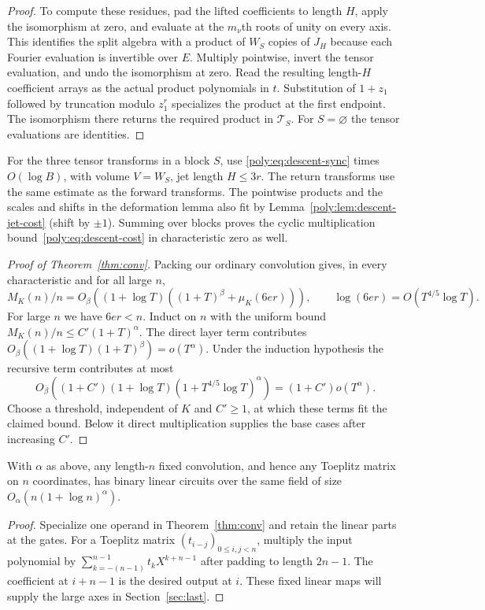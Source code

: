 \begin{proof}
To compute these residues, pad the lifted coefficients to length $H$,
apply the isomorphism at zero, and evaluate at the $m_\nu$th roots of
unity on every axis. This identifies the split algebra with a product
of $W_S$ copies of $J_H$ because each Fourier evaluation is invertible
over $E$. Multiply pointwise, invert the tensor evaluation, and undo
the isomorphism at zero. Read the resulting length-$H$ coefficient
arrays as the actual product polynomials in $t$. Substitution of $1+z_1$
followed by truncation modulo $z_1^r$ specializes the product at the first
endpoint. The isomorphism there returns the required product in
$\mathcal T_S$. For $S=\varnothing$ the tensor evaluations are identities.
\end{proof}

For the three tensor transforms in a block $S$,
use \eqref{poly:eq:descent-sync} times $O(\log B)$, with volume
$V=W_S$, jet length $H\le3r$. The return transforms use
the same estimate as the forward transforms. The pointwise
products and the scales and shifts in the deformation lemma
also fit by Lemma~\ref{poly:lem:descent-jet-cost}
(shift by $\pm1$).
Summing over blocks proves the cyclic multiplication
bound~\eqref{poly:eq:descent-cost} in characteristic zero as well.

\begin{proof}[Proof of Theorem~\ref{thm:conv}]
Packing our ordinary convolution gives, in every characteristic and for all large $n$,
\[
 M_K(n)/n=O_\beta((1+\log T)((1+T)^\beta+\mu_K(6er))),
 \qquad \log(6er)=O(T^{4/5}\log T).
\]
For large $n$ we have $6er<n$. Induct on $n$ with the uniform
bound $M_K(n)/n\le C'(1+T)^\alpha$. The direct layer term contributes
$O_\beta((1+\log T)(1+T)^\beta)=o(T^\alpha)$.
Under the induction hypothesis the recursive term contributes at most
\[
  O_\beta\!\left((1+C')(1+\log T)
                       (1+T^{4/5}\log T)^\alpha\right)
     =(1+C')o(T^\alpha).
\]
Choose a threshold, independent of $K$ and $C'\ge1$, at which these
terms fit the claimed bound. Below it direct multiplication supplies
the base cases after increasing $C'$.
\end{proof}

\begin{corollary}\label{cor:toe}
With $\alpha$ as above, any length-$n$ fixed convolution,
and hence any Toeplitz matrix on $n$ coordinates, has binary linear circuits over
the same field of size $O_\alpha(n(1+\log n)^\alpha)$.
\end{corollary}
\begin{proof}
Specialize one operand in Theorem~\ref{thm:conv} and retain the
linear parts at the gates. For a Toeplitz matrix $(t_{i-j})_{0\le i,j<n}$,
multiply the input polynomial by
$\sum_{k=-(n-1)}^{n-1}t_kX^{k+n-1}$ after padding to length $2n-1$.
The coefficient at $i+n-1$ is the desired output at $i$. These fixed
linear maps will supply the large axes in Section~\ref{sec:last}.
\end{proof}
